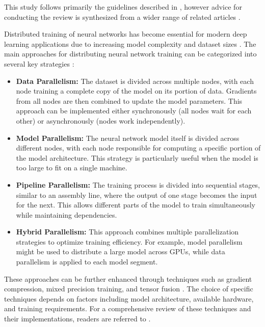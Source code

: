 This study follows primarily the guidelines described in \cite{keele_systematic_2007}, however
advice for conducting the review is synthesized from a wider range of related articles
\cite{brereton_lessons_2007-1,kitchenham_procedures_nodate,budgen_reporting_2018,dos_santos_sustainable_2024}.

Distributed training of neural networks has become essential for modern deep learning applications
due to increasing model complexity and dataset sizes \cite{chahal_hitchhikers_2018}. The main
approaches for distributing neural network training can be categorized into several key strategies
\cite{dehghani_distributed_2023}:

\begin{itemize}
	\item \textbf{Data Parallelism:}
	      The dataset is divided across multiple nodes, with each node training a complete copy of the
	      model on its portion of data. Gradients from all nodes are then combined to update the model parameters.
	      This approach can be implemented either synchronously (all nodes wait for each other) or asynchronously (nodes work independently).

	\item \textbf{Model Parallelism:}
	      The neural network model itself is divided across different nodes, with each node responsible
	      for computing a specific portion of the model architecture. This strategy is particularly useful
	      when the model is too large to fit on a single machine.

	\item \textbf{Pipeline Parallelism:}
	      The training process is divided into sequential stages, similar to an assembly line,
	      where the output of one stage becomes the input for the next. This allows different parts
	      of the model to train simultaneously while maintaining dependencies.

	\item \textbf{Hybrid Parallelism:}
	      This approach combines multiple parallelization strategies to optimize training efficiency.
	      For example, model parallelism might be used to distribute a large model across GPUs, while
	      data parallelism is applied to each model segment.
\end{itemize}

These approaches can be further enhanced through techniques such as gradient compression, mixed
precision training, and tensor fusion \cite{dehghani_distributed_2023}. The choice of specific
techniques depends on factors including model architecture, available hardware, and training
requirements. For a comprehensive review of these techniques and their implementations, readers are
referred to \cite{chahal_hitchhikers_2018}.

